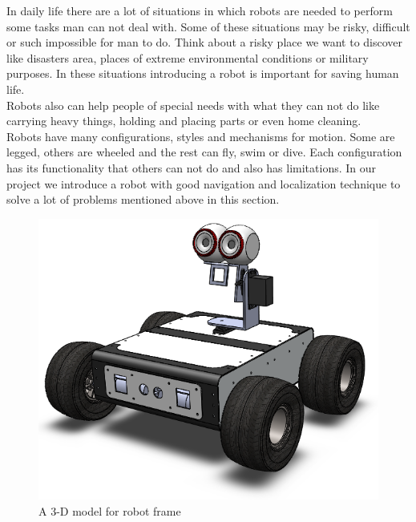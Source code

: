 \documentclass[12pt]{book}
\begin{document}
 In daily life there are a lot of situations in which robots are needed to perform some tasks man can not deal with. Some of these situations may be risky, difficult or such impossible for man to do. Think about a risky place we want to discover like disasters area, places of extreme environmental conditions or military purposes. In these situations introducing a robot is important for saving human life.\\
 Robots also can help people of special needs with what they can not do like carrying heavy things, holding and placing parts or even home cleaning.\\
 Robots have many configurations, styles and mechanisms for motion. Some are legged, others are wheeled and the rest can fly, swim or dive. Each configuration has its functionality that others can not do and also has limitations.
 In our project we introduce a robot with good navigation and localization technique to solve a lot of problems mentioned above in this section. 

\begin{figure}[h]
\centering
\includegraphics[width =.4\textwidth]{Fig/Introduction.png}
\caption{ A 3-D model for robot frame}
\end{figure}

\end{document}
